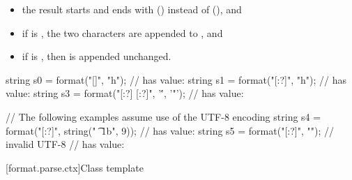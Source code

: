 \begin{itemize}
\item
the result starts and ends with  ()
instead of  (), and
\item
if  is ,
the two characters  are appended to , and
\item
if  is ,
then  is appended unchanged.
\end{itemize}

\begin{example}
\begin{codeblock}
string s0 = format("[{}]", "h\tllo");                   //  has value: \tcode{[h    llo]}
string s1 = format("[{:?}]", "h\tllo");                 //  has value: 
string s3 = format("[{:?}] [{:?}]", '\'', '"');         //  has value: \tcode{['\textbackslash '', '"']}

// The following examples assume use of the UTF-8 encoding
string s4 = format("[{:?}]", string("\0 \n \t {} \x1b", 9));
                                                        //  has value: 
string s5 = format("[{:?}]", "");               // invalid UTF-8
                                                        //  has value: 
\end{codeblock}
\end{example}

[format.parse.ctx]{Class template }

